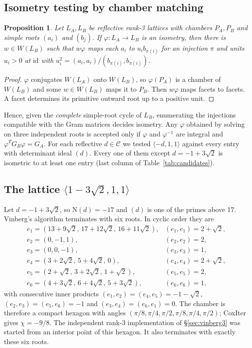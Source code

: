 \documentclass[11pt]{amsart}
\newtheorem{proposition}[theorem]{Proposition}
\theoremstyle{definition}
\newcommand{\id}{\mathrm{id}}
\newcommand{\N}{\mathrm{N}}
\begin{document}
\subsection{Isometry testing by chamber matching}
\begin{proposition}\label{prop:matching}
Let $L_A,L_B$ be reflective rank-3 lattices with chambers $P_A,P_B$ and simple roots
$(a_i)$ and $(b_j)$. If $\varphi\colon L_A\to L_B$ is an isometry, then there is $w\in W(L_B)$
such that $w\varphi$ maps each $a_i$ to $u_i b_{\pi(i)}$ for an injection $\pi$ and units
$u_i>0$ at $\id$ with $u_i^2=(a_i,a_i)/(b_{\pi(i)},b_{\pi(i)})$.
\end{proposition}
\begin{proof}
$\varphi$ conjugates $W(L_A)$ onto $W(L_B)$, so $\varphi(P_A)$ is a chamber of $W(L_B)$ and
some $w\in W(L_B)$ maps it to $P_B$. Then $w\varphi$ maps facets to facets. A facet determines
its primitive outward root up to a positive unit.
\end{proof}
Hence, given the \emph{complete} simple-root cycle of $L_B$, enumerating the injections
compatible with the Gram matrices decides isometry. Any $\varphi$ obtained by solving on three
independent roots is accepted only if $\varphi$ and $\varphi^{-1}$ are integral and
$\varphi^TG_B\varphi=G_A$. For each reflective $d\in\mathcal C$ we tested
$\langle-d,1,1\rangle$ against every entry with determinant ideal $(d)$. Every one of them
except $d=-1+3\sqrt2$ is isometric to at least one entry (last column of
Table~\ref{tab:candidates}).

\subsection{The lattice $\langle1-3\sqrt2,1,1\rangle$}
Let $d=-1+3\sqrt2$, so $\N(d)=-17$ and $(d)$ is one of the primes above 17. Vinberg's algorithm
terminates with six roots. In cyclic order they are
\[
\begin{array}{lll}
e_1=(13+9\sqrt2,\,17+12\sqrt2,\,16+11\sqrt2), & (e_1,e_1)=2+\sqrt2,\\
e_2=(0,-1,1), & (e_2,e_2)=2,\\
e_3=(0,0,-1), & (e_3,e_3)=1,\\
e_4=(3+2\sqrt2,\,5+4\sqrt2,\,0), & (e_4,e_4)=2+\sqrt2,\\
e_5=(2+\sqrt2,\,3+2\sqrt2,\,1+\sqrt2), & (e_5,e_5)=2,\\
e_6=(4+3\sqrt2,\,6+4\sqrt2,\,5+3\sqrt2), & (e_6,e_6)=1,
\end{array}
\]
with consecutive inner products
$(e_1,e_2)=(e_4,e_5)=-1-\sqrt2$, $(e_2,e_3)=(e_5,e_6)=-1$ and $(e_3,e_4)=(e_6,e_1)=0$. The
chamber is therefore a compact hexagon with angles
$(\pi/8,\pi/4,\pi/2,\pi/8,\pi/4,\pi/2)$; CoxIter gives $\chi=-9/8$. The independent rank-3
implementation of \S\ref{sec:vinberg3} was started from an interior point of this hexagon. It
also terminates with exactly these six roots.
\end{document}
